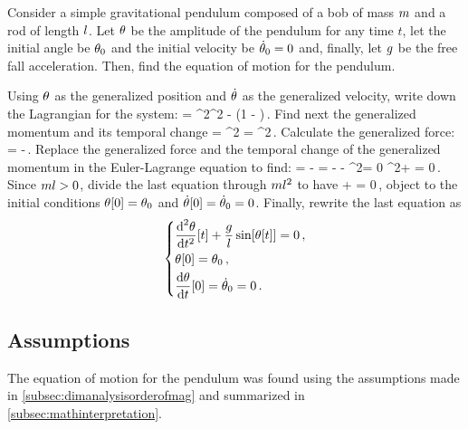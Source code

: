 Consider a simple gravitational pendulum composed of a bob of mass $m$ and a rod of length $l$. Let $\theta$ be the amplitude of the pendulum for any time $t$, let the initial angle be $\theta_0$ and the initial velocity be $\dot{\theta}_0 = 0$ and, finally, let $g$ be the free fall acceleration. Then, find the equation of motion for the pendulum.

Using $\theta$ as the generalized position and $\dot{\theta}$ as the generalized velocity, write down the Lagrangian for the system:
\beq
\lag = \mass\length^2\angvel^2 - \mass\grav\length\left(1 - \cos\vat{\angpos}\right)\,.
\eeq
Find next the generalized momentum and its temporal change
\beq
\ipd{\angvel}{\lag} = \mass\length^2\angvel\implies
{}\ipd{\angvel}{\lag} = \mass\length^2\angacc\,.
\eeq
Calculate the generalized force:
\beq
\ipd{\angpos}{\lag} = -\mass\grav\length\sin\vat\angpos\,.
\eeq
Replace the generalized force and the temporal change of the generalized momentum in the Euler-Lagrange equation to find:
\beq
\elop{\angpos}{\angvel}\lag = \ipd{\angpos}{\lag} - \ipd{\angvel}{\lag}
    = - \mass\grav\length\sin\vat\angpos - \mass\length^2\angacc = 0 \implies
    \mass\length^2\angacc + \mass\grav\length\sin\vat\angpos = 0\,.
\eeq
Since $ml > 0$, divide the last equation through $ml^2$ to have
\beq
\angacc + \dfrac{\grav}{\length}\sin\vat\angpos = 0\,,
\eeq
object to the initial conditions $\theta\!\left[{0}\right] = \theta_0$ and $\dot{\theta}\!\left[{0}\right] = \dot{\theta}_0 = 0$. Finally, rewrite the last equation as
\begin{equation}\label{eq:mathmodelsimppend}
  \begin{dcases}
    \dfrac{\text{d}^{2}{\theta}}{\text{d}{t}^{2}}\!\left[{t}\right] + \dfrac{g}{l}\sin\!\left[{\theta\!\left[{t}\right]}\right] = 0\,,\\
    \theta\!\left[{0}\right] = \theta_0\,,\\
    \dfrac{\text{d}{\theta}}{\text{d}{t}}\!\left[{0}\right] = \dot{\theta}_0 = 0\,.
  \end{dcases}
\end{equation}


\subsection{Assumptions}\label{subsec:assumptions}
The equation of motion for the pendulum was found using the assumptions made in \cref{subsec:dimanalysisorderofmag} and summarized in \cref{subsec:mathinterpretation}.
